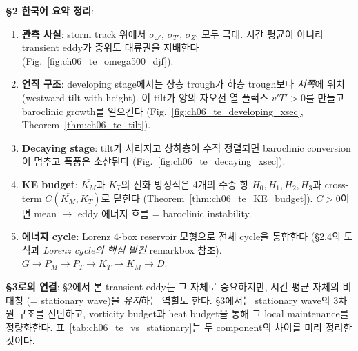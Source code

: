 
\begin{hisublock}
\textbf{§2 한국어 요약 정리}:
\begin{enumerate}
  \item \textbf{관측 사실}: storm track 위에서 $\sigma_{\omega'}$,
        $\sigma_{T'}$, $\sigma_{Z'}$ 모두 극대.  시간 평균이 아니라
        transient eddy가 중위도 대류권을 지배한다
        (Fig.~\ref{fig:ch06_te_omega500_djf}).
  \item \textbf{연직 구조}: developing stage에서는 상층 trough가 하층
        trough보다 \textit{서쪽}에 위치 (westward tilt with height).
        이 tilt가 양의 자오선 열 플럭스 $\overline{v'T'}>0$를 만들고
        baroclinic growth를 일으킨다
        (Fig.~\ref{fig:ch06_te_developing_xsec},
        Theorem~\ref{thm:ch06_te_tilt}).
  \item \textbf{Decaying stage}: tilt가 사라지고 상하층이 수직 정렬되면
        baroclinic conversion이 멈추고 폭풍은 소산된다
        (Fig.~\ref{fig:ch06_te_decaying_xsec}).
  \item \textbf{KE budget}: $\overline{K_M}$과 $K_T$의 진화 방정식은
        4개의 수송 항 $H_0,H_1,H_2,H_3$과 cross-term
        $C(\overline{K_M},K_T)$로 닫힌다
        (Theorem~\ref{thm:ch06_te_KE_budget}).
        $C > 0$이면 mean $\to$ eddy 에너지 흐름 = baroclinic
        instability.
  \item \textbf{에너지 cycle}: Lorenz 4-box reservoir 모형으로 전체 cycle을
        통합한다 (§2.4의 도식과 \textit{Lorenz cycle의 핵심 발견} remarkbox 참조).
        $G \to \overline{P_M} \to P_T \to K_T \to \overline{K_M} \to D$.
\end{enumerate}

\medskip
\textbf{§3로의 연결}: \S2에서 본 transient eddy는 그 자체로 중요하지만,
시간 평균 자체의 비대칭 (= stationary wave)을 \textit{유지}하는 역할도
한다.  \S3에서는 stationary wave의 3차원 구조를 진단하고, vorticity
budget과 heat budget을 통해 그 local maintenance를 정량화한다.
표~\ref{tab:ch06_te_vs_stationary}는 두 component의 차이를 미리 정리한
것이다.
\end{hisublock}

